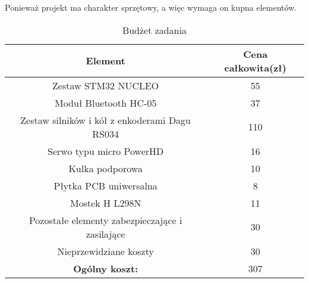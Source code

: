 Ponieważ projekt ma charakter sprzętowy, a więc wymaga on kupna elementów. 


\begin{table}[!htbp]
\begin{center}
\begin{tabular}{|c|c|}
\hline
\textbf{Element} & \textbf{Cena całkowita(zł)} \\ \hline\hline
Zestaw STM32 NUCLEO & 55 \\ \hline
Moduł Bluetooth HC-05 & 37 \\ \hline
Zestaw silników i kół z enkoderami Dagu RS034 & 110 \\ \hline
Serwo typu micro PowerHD & 16 \\ \hline
Kulka podporowa & 10 \\ \hline
Płytka PCB uniwersalna & 8 \\ \hline
Mostek H L298N & 11 \\ \hline
Pozostałe elementy zabezpieczające i zasilające & 30 \\ \hline
Nieprzewidziane koszty & 30 \\ \hline\hline
\textbf{Ogólny koszt:} & 307 \\ \hline

\end{tabular}
\caption{Budżet zadania}
\end{center}
\end{table}

